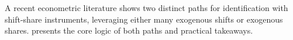 A recent econometric literature shows two distinct paths for identification with shift-share instruments, 
leveraging either many exogenous shifts or exogenous shares. 
\cite{Borusyak:2024} presents the core logic of both paths and practical takeaways.

